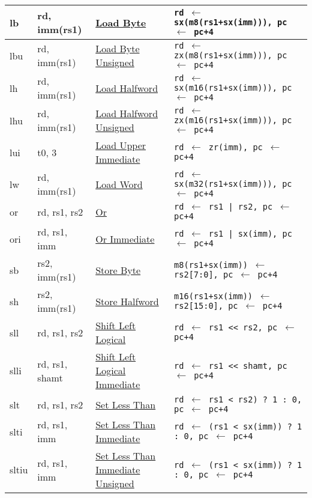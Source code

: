 \begin{tabular}{|ll|l|l|}
\hline
lb    & rd, imm(rs1)  & \hyperref[insn:lb]{Load Byte}                   & {\tt rd $\leftarrow$ sx(m8(rs1+sx(imm))), pc $\leftarrow$ pc+4}\\
\hline
lbu   & rd, imm(rs1)  & \hyperref[insn:lbu]{Load Byte Unsigned}         & {\tt rd $\leftarrow$ zx(m8(rs1+sx(imm))), pc $\leftarrow$ pc+4}\\
\hline
lh    & rd, imm(rs1)  & \hyperref[insn:lh]{Load Halfword}               & {\tt rd $\leftarrow$ sx(m16(rs1+sx(imm))), pc $\leftarrow$ pc+4}\\
\hline
lhu   & rd, imm(rs1)  & \hyperref[insn:lhu]{Load Halfword Unsigned}     & {\tt rd $\leftarrow$ zx(m16(rs1+sx(imm))), pc $\leftarrow$ pc+4}\\
\hline
lui   & t0, 3        & \hyperref[insn:lui]{Load Upper Immediate}        & {\tt rd $\leftarrow$ zr(imm), pc $\leftarrow$ pc+4}\\
\hline
lw    & rd, imm(rs1)  & \hyperref[insn:lw]{Load Word}                   & {\tt rd $\leftarrow$ sx(m32(rs1+sx(imm))), pc $\leftarrow$ pc+4}\\
\hline
or    & rd, rs1, rs2   & \hyperref[insn:or]{Or}                         & {\tt rd $\leftarrow$ rs1 | rs2, pc $\leftarrow$ pc+4}\\
\hline
ori   & rd, rs1, imm  & \hyperref[insn:ori]{Or Immediate}               & {\tt rd $\leftarrow$ rs1 | sx(imm), pc $\leftarrow$ pc+4}\\
\hline
sb    & rs2, imm(rs1) & \hyperref[insn:sb]{Store Byte}                  & {\tt m8(rs1+sx(imm)) $\leftarrow$ rs2[7:0], pc $\leftarrow$ pc+4}\\
\hline
sh    & rs2, imm(rs1) & \hyperref[insn:sh]{Store Halfword}              & {\tt m16(rs1+sx(imm)) $\leftarrow$ rs2[15:0], pc $\leftarrow$ pc+4}\\
\hline
sll   & rd, rs1, rs2   & \hyperref[insn:sll]{Shift Left Logical}        & {\tt rd $\leftarrow$ rs1 << rs2, pc $\leftarrow$ pc+4}\\
\hline
slli  & rd, rs1, shamt & \hyperref[insn:slli]{Shift Left Logical Immediate} & {\tt rd $\leftarrow$ rs1 << shamt, pc $\leftarrow$ pc+4}\\
\hline
slt   & rd, rs1, rs2   & \hyperref[insn:slt]{Set Less Than}             & {\tt rd $\leftarrow$ rs1 < rs2) ? 1 : 0, pc $\leftarrow$ pc+4}\\
\hline
slti  & rd, rs1, imm  & \hyperref[insn:slti]{Set Less Than Immediate}   & {\tt rd $\leftarrow$ (rs1 < sx(imm)) ? 1 : 0, pc $\leftarrow$ pc+4}\\
\hline
sltiu & rd, rs1, imm  & \hyperref[insn:sltiu]{Set Less Than Immediate Unsigned} & {\tt rd $\leftarrow$ (rs1 < sx(imm)) ? 1 : 0, pc $\leftarrow$ pc+4}\\

\end{tabular}
